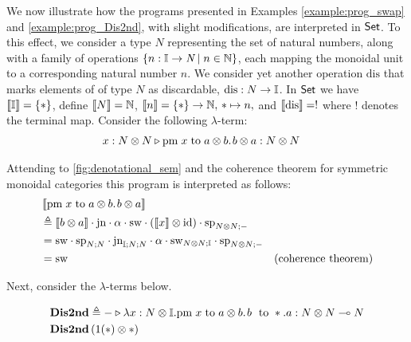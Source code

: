 \begin{example}
  We now illustrate how the programs presented in Examples \ref{example:prog_swap} and \ref{example:prog_Dis2nd}, with slight modifications, are interpreted in $\mathsf{Set}$.
   To this effect, we consider a type $N$ representing the set of natural numbers, along with a family of operations $\{n : \mathbb{I} \to \emph{N} \mid n \in \mathbb{N}\}$, each mapping the monoidal unit to a corresponding natural number $n$.
   We consider yet another operation $\text{dis}$ that marks elements of of type $N$ as discardable, $\text{dis}: N \to \mathbb{I} $.
  In $\mathsf{Set}$ we have $\left \llbracket \mathbb{I} \right \rrbracket= \{*\}$, define $\left \llbracket N \right \rrbracket = \mathbb{N}$,   $\left \llbracket n \right \rrbracket = \{*\} \to \mathbb{N}, \, * \mapsto n,$ and $\left \llbracket \text{dis} \right \rrbracket=!$ where $!$ denotes the terminal map. 
   Consider the following $\lambda$-term:
   \begin{equation*}
   \begin{split}
    &   x : N \otimes N \triangleright \text{pm} \hspace{3 pt} x \hspace{3 pt} \text{to} \hspace{3 pt} a \otimes b. \hspace{1pt} b \otimes a : N \otimes N 
  \end{split}
  \end{equation*}
  
   Attending to \autoref{fig:denotational_sem} and the coherence theorem for symmetric monoidal categories this program is interpreted as follows:
   \begin{align*}
   &  \left \llbracket  \text{pm} \hspace{3 pt} x \hspace{3 pt} \text{to} \hspace{3 pt} a \otimes b. \hspace{1pt} b \otimes a  \right \rrbracket \\
   & \triangleq \left \llbracket b \otimes a \right \rrbracket \cdot \mathrm{jn} \cdot \alpha \cdot \mathrm{sw} \cdot \left( \left \llbracket x \right \rrbracket \otimes \mathrm{id}\right) \cdot \mathrm{sp}_{N \otimes N;-}   \\
   & = \mathrm{sw} \cdot \mathrm{sp}_{N;N} \cdot \mathrm{jn}_{\mathbb{I}; N; N} \cdot \alpha \cdot \mathrm{sw}_{N \otimes N;\mathbb{I}} \cdot \mathrm{sp}_{N \otimes N;-} \\
   & = \mathrm{sw}  & ( \text{coherence theorem}) 
   \end{align*}

   Next, consider the  $\lambda$-terms below.

   \begin{equation*}
    \begin{split}
    & \textbf{Dis2nd} \triangleq - \triangleright \lambda x: N \otimes \mathbb{I}. \text{pm} \hspace{3 pt} x \hspace{3 pt} \text{to} \hspace{3 pt} a \otimes b. \hspace{1 pt} b \hspace{3 pt} \text{ to } *.a: N \otimes N \multimap N \\
    & \textbf{Dis2nd} \,(1 (*) \otimes *) \\
    \end{split}
   \end{equation*}


\end{example}
